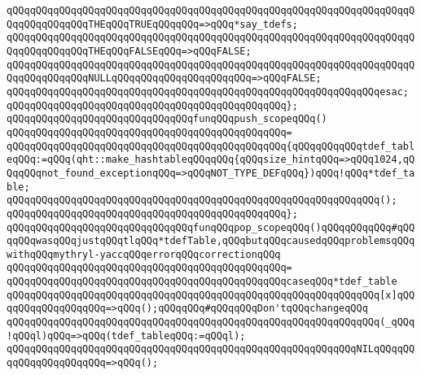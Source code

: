 \newline
\verb|qQQqqQQqqQQqqQQqqQQqqQQqqQQqqQQqqQQqqQQqqQQqqQQqqQQqqQQqqQQqqQQqqQQqqQQqqQQqqQQqqQQqTHEqQQqTRUEqQQqqQQq=>qQQq*say_tdefs;|\newline
\verb|qQQqqQQqqQQqqQQqqQQqqQQqqQQqqQQqqQQqqQQqqQQqqQQqqQQqqQQqqQQqqQQqqQQqqQQqqQQqqQQqqQQqTHEqQQqFALSEqQQq=>qQQqFALSE;|\newline
\verb|qQQqqQQqqQQqqQQqqQQqqQQqqQQqqQQqqQQqqQQqqQQqqQQqqQQqqQQqqQQqqQQqqQQqqQQqqQQqqQQqqQQqNULLqQQqqQQqqQQqqQQqqQQqqQQq=>qQQqFALSE;|\newline
\verb|qQQqqQQqqQQqqQQqqQQqqQQqqQQqqQQqqQQqqQQqqQQqqQQqqQQqqQQqqQQqqQQqesac;|\newline
\verb|qQQqqQQqqQQqqQQqqQQqqQQqqQQqqQQqqQQqqQQqqQQqqQQq};|\newline
\newline
\newline
\verb|qQQqqQQqqQQqqQQqqQQqqQQqqQQqqQQqfunqQQqpush_scopeqQQq()|\newline
\verb|qQQqqQQqqQQqqQQqqQQqqQQqqQQqqQQqqQQqqQQqqQQqqQQq=|\newline
\verb|qQQqqQQqqQQqqQQqqQQqqQQqqQQqqQQqqQQqqQQqqQQqqQQq{qQQqqQQqqQQqtdef_tableqQQq:=qQQq(qht::make_hashtableqQQqqQQq{qQQqsize_hintqQQq=>qQQq1024,qQQqqQQqnot_found_exceptionqQQq=>qQQqNOT_TYPE_DEFqQQq})qQQq!qQQq*tdef_table;|\newline
\verb|qQQqqQQqqQQqqQQqqQQqqQQqqQQqqQQqqQQqqQQqqQQqqQQqqQQqqQQqqQQqqQQq();|\newline
\verb|qQQqqQQqqQQqqQQqqQQqqQQqqQQqqQQqqQQqqQQqqQQqqQQq};|\newline
\newline
\verb|qQQqqQQqqQQqqQQqqQQqqQQqqQQqqQQqfunqQQqpop_scopeqQQq()qQQqqQQqqQQq#qQQqqQQqwasqQQqjustqQQqtlqQQq*tdefTable,qQQqbutqQQqcausedqQQqproblemsqQQqwithqQQqmythryl-yaccqQQqerrorqQQqcorrectionqQQq|\newline
\verb|qQQqqQQqqQQqqQQqqQQqqQQqqQQqqQQqqQQqqQQqqQQqqQQq=|\newline
\verb|qQQqqQQqqQQqqQQqqQQqqQQqqQQqqQQqqQQqqQQqqQQqqQQqcaseqQQq*tdef_table|\newline
\verb|qQQqqQQqqQQqqQQqqQQqqQQqqQQqqQQqqQQqqQQqqQQqqQQqqQQqqQQqqQQqqQQq[x]qQQqqQQqqQQqqQQqqQQq=>qQQq();qQQqqQQq#qQQqqQQqDon'tqQQqchangeqQQq|\newline
\verb|qQQqqQQqqQQqqQQqqQQqqQQqqQQqqQQqqQQqqQQqqQQqqQQqqQQqqQQqqQQqqQQq(_qQQq!qQQql)qQQq=>qQQq(tdef_tableqQQq:=qQQql);|\newline
\verb|qQQqqQQqqQQqqQQqqQQqqQQqqQQqqQQqqQQqqQQqqQQqqQQqqQQqqQQqqQQqNILqQQqqQQqqQQqqQQqqQQqqQQq=>qQQq();|\newline
